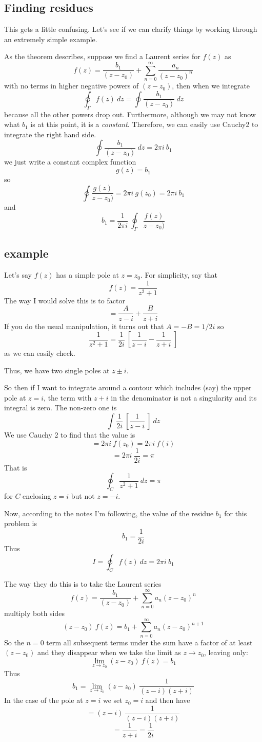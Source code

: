 \documentclass[11pt, oneside]{article}   	%
\begin{document}
\subsection*{Finding residues}
This gets a little confusing.  Let's see if we can clarify things by working through an extremely simple example.  

As the theorem describes, suppose we find a Laurent series for $f(z)$ as
\[ f(z) = \frac{b_1}{(z-z_0)} + \sum_{n=0}^{\infty} \frac{a_n}{(z-z_0)^n} \]
with no terms in higher negative powers of $(z-z_0)$, then when we integrate
\[ \oint_{\Gamma}  f(z) \ dz = \oint \frac{b_1}{(z-z_0)} \ dz \]
because all the other powers drop out.
Furthermore, although we may not know what $b_1$ is at this point, it is a \emph{constant}.  Therefore, we can easily use Cauchy2 to integrate the right hand side.
 \[ \oint \frac{b_1}{(z-z_0)} \ dz = 2 \pi i \ b_1 \]
 we just write a constant complex function
 \[ g(z) = b_1 \]
 so 
 \[ \oint \frac{g(z)}{z-z_0)} = 2 \pi i \ g(z_0) = 2 \pi i \ b_1 \]
and
\[ b_1 = \frac{1}{2 \pi i} \ \oint_{\Gamma} \frac{f(z)}{z-z_0)} \]

\subsection*{example}
Let's say $f(z)$ has a simple pole at $z = z_0$.  For simplicity, say that 
\[ f(z) = \frac{1}{z^2 + 1} \]
The way I would solve this is to factor
\[ = \frac{A}{z - i} + \frac{B}{z + i} \]
If you do the usual manipulation, it turns out that $A = -B = 1/2i$ so
\[ \frac{1}{z^2 + 1}  = \frac{1}{2i} \ [ \frac{1}{z - i} - \frac{1}{z + i} \ ] \]
as we can easily check.

Thus, we have two single poles at $z \pm i$.  

So then if I want to integrate around a contour which includes (say) the upper pole at $z = i$, the term with $z + i$ in the denominator is not a singularity and its integral is zero.  The non-zero one is
\[ \int \frac{1}{2i} \ [ \frac{1}{z - i} \ ] \ dz \]
We use Cauchy 2 to find that the value is
\[ = 2 \pi i \ f(z_0) =  2 \pi i \ f(i) \]
\[ = 2 \pi i \ \frac{1}{2i} = \pi \]
That is
\[  \oint_C \frac{1}{z^2 + 1} \ dz = \pi \]
for $C$ enclosing $z=i$ but not $z = -i$.

Now, according to the notes I'm following, the value of the residue $b_1$ for this problem is 
\[ b_1 = \frac{1}{2i} \]
Thus
\[ I = \oint_C f(z) \ dz = 2 \pi i \ b_1 \]

The way they do this is to take the Laurent series
\[ f(z) = \frac{b_1}{(z-z_0)} + \sum_{n=0}^{\infty} a_n (z-z_0)^n \]
multiply both sides
\[ (z-z_0) \ f(z) = b_1 + \sum_{n=0}^{\infty} a_n (z-z_0)^{n+1} \]
So the $n=0$ term all subsequent terms under the sum have a factor of at least $(z - z_0)$ and they disappear when we take the limit as $z \rightarrow z_0$, leaving only:
\[ \lim_{z \rightarrow z_0} (z-z_0) \ f(z) = b_1 \]
Thus
\[ b_1 = \lim_{z \rightarrow z_0} (z-z_0) \ \frac{1}{(z - i)(z + i)} \]
In the case of the pole at $z = i$ we set $z_0 = i$ and then have
\[ = (z-i) \ \frac{1}{(z - i)(z + i)} \]
\[ = \frac{1}{z + i} = \frac{1}{2i} \]
\end{document}
